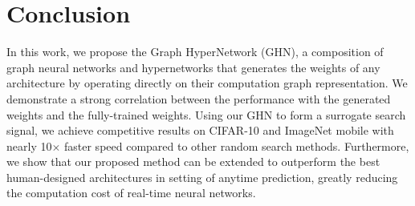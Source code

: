 \vspace{-0.1cm}
\section{Conclusion}
In this work, we propose the Graph HyperNetwork (GHN), a composition of graph neural networks and
hypernetworks that generates the weights of any architecture by operating directly on their
computation graph representation. We demonstrate a strong correlation between the performance with
the generated weights and the fully-trained weights. Using our GHN to form a surrogate search
signal, we achieve competitive results on CIFAR-10 and ImageNet mobile with nearly 10$\times$ faster
speed compared to other random search methods. Furthermore, we show that our proposed method can be
extended to outperform the best human-designed architectures in setting of anytime prediction,
greatly reducing the computation cost of real-time neural networks.